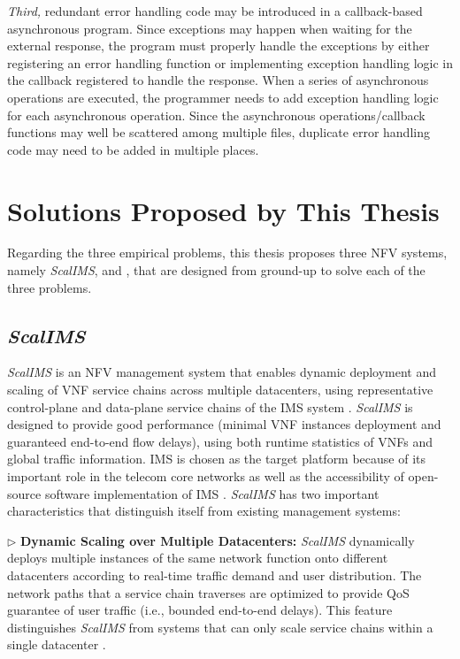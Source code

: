 \textit{Third,} redundant error handling code may be introduced in a callback-based asynchronous program. Since exceptions may happen when waiting for the external response, the program must properly handle the exceptions by either registering an error handling function or implementing exception handling logic in the callback registered to handle the response. When a series of asynchronous operations are executed, the programmer needs to add exception handling logic for each asynchronous operation. %
 Since the asynchronous operations/callback functions may well be scattered among multiple files, duplicate error handling code may need to be added in multiple places.

\section{Solutions Proposed by This Thesis}

Regarding the three empirical problems, this thesis proposes three NFV systems, namely \textit{ScalIMS}, \nfactor and \netstar, that are designed from ground-up to solve each of the three problems.

\subsection{\textit{ScalIMS}}

\textit{ScalIMS} is an NFV management system that enables dynamic deployment and scaling of VNF service chains across multiple datacenters, using representative control-plane and data-plane service chains of the IMS system \cite{3gpp-ims}. \textit{ScalIMS} is designed to provide good performance (minimal VNF instances deployment and guaranteed end-to-end flow delays), using both runtime statistics of VNFs and global traffic information. IMS is chosen as the target platform because of its important role in the telecom core networks as well as the accessibility of open-source software implementation of IMS \cite{project-clearwater}. \textit{ScalIMS} has two important characteristics that distinguish itself from existing management systems:

$\triangleright$ \textbf{Dynamic Scaling over Multiple Datacenters:} \textit{ScalIMS} dynamically deploys multiple instances of the same network function onto different datacenters according to real-time traffic demand and user distribution. The network paths that a service chain traverses are optimized to provide QoS guarantee of user traffic (i.e., bounded end-to-end delays). This feature distinguishes \textit{ScalIMS} from systems that can only scale service chains within a single datacenter \cite{palkar2015e2, gember2012stratos}.

